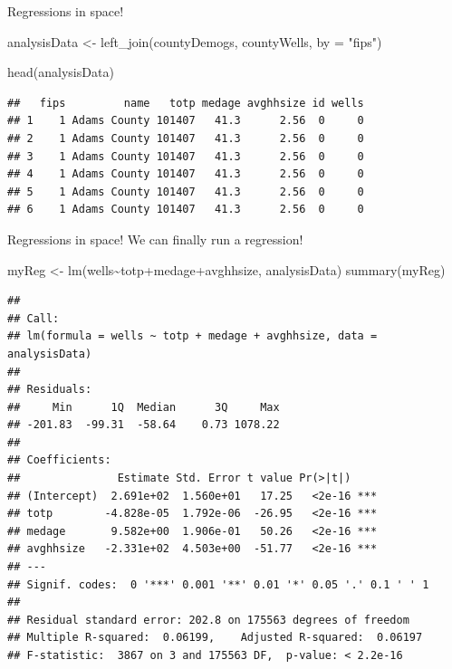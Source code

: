 \documentclass[
  ignorenonframetext,
]{beamer}
\newenvironment{Shaded}{\begin{snugshade}}{\end{snugshade}}
\newcommand{\AttributeTok}[1]{\textcolor[rgb]{0.77,0.63,0.00}{#1}}
\newcommand{\FunctionTok}[1]{\textcolor[rgb]{0.00,0.00,0.00}{#1}}
\newcommand{\NormalTok}[1]{#1}
\newcommand{\OtherTok}[1]{\textcolor[rgb]{0.56,0.35,0.01}{#1}}
\newcommand{\SpecialCharTok}[1]{\textcolor[rgb]{0.00,0.00,0.00}{#1}}
\newcommand{\StringTok}[1]{\textcolor[rgb]{0.31,0.60,0.02}{#1}}
\begin{document}
\begin{frame}[fragile]{Regressions in space!}
\begin{Shaded}
\begin{Highlighting}[]
\NormalTok{analysisData }\OtherTok{\textless{}{-}} \FunctionTok{left\_join}\NormalTok{(countyDemogs, countyWells, }\AttributeTok{by =} \StringTok{"fips"}\NormalTok{) }

\FunctionTok{head}\NormalTok{(analysisData)}
\end{Highlighting}
\end{Shaded}

\begin{verbatim}
##   fips         name   totp medage avghhsize id wells
## 1    1 Adams County 101407   41.3      2.56  0     0
## 2    1 Adams County 101407   41.3      2.56  0     0
## 3    1 Adams County 101407   41.3      2.56  0     0
## 4    1 Adams County 101407   41.3      2.56  0     0
## 5    1 Adams County 101407   41.3      2.56  0     0
## 6    1 Adams County 101407   41.3      2.56  0     0
\end{verbatim}
\end{frame}

\begin{frame}[fragile]{Regressions in space!}
\protect\hypertarget{regressions-in-space-2}{}
We can finally run a regression! \tiny

\begin{Shaded}
\begin{Highlighting}[]
\NormalTok{myReg }\OtherTok{\textless{}{-}} \FunctionTok{lm}\NormalTok{(wells}\SpecialCharTok{\textasciitilde{}}\NormalTok{totp}\SpecialCharTok{+}\NormalTok{medage}\SpecialCharTok{+}\NormalTok{avghhsize, analysisData)}
\FunctionTok{summary}\NormalTok{(myReg)}
\end{Highlighting}
\end{Shaded}

\begin{verbatim}
## 
## Call:
## lm(formula = wells ~ totp + medage + avghhsize, data = analysisData)
## 
## Residuals:
##     Min      1Q  Median      3Q     Max 
## -201.83  -99.31  -58.64    0.73 1078.22 
## 
## Coefficients:
##               Estimate Std. Error t value Pr(>|t|)    
## (Intercept)  2.691e+02  1.560e+01   17.25   <2e-16 ***
## totp        -4.828e-05  1.792e-06  -26.95   <2e-16 ***
## medage       9.582e+00  1.906e-01   50.26   <2e-16 ***
## avghhsize   -2.331e+02  4.503e+00  -51.77   <2e-16 ***
## ---
## Signif. codes:  0 '***' 0.001 '**' 0.01 '*' 0.05 '.' 0.1 ' ' 1
## 
## Residual standard error: 202.8 on 175563 degrees of freedom
## Multiple R-squared:  0.06199,    Adjusted R-squared:  0.06197 
## F-statistic:  3867 on 3 and 175563 DF,  p-value: < 2.2e-16
\end{verbatim}
\end{frame}
\end{document}
